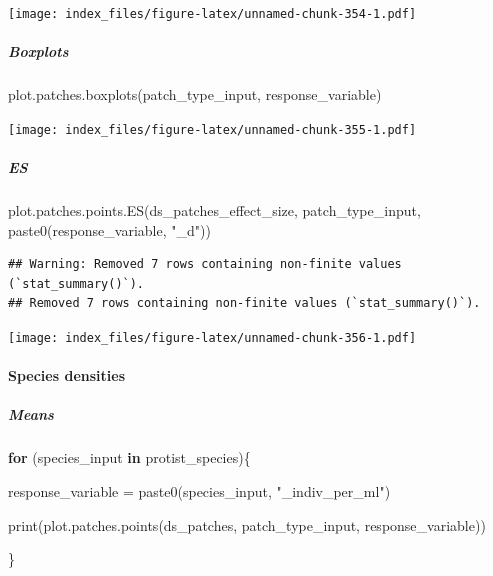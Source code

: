 \documentclass[
]{article}
\newenvironment{Shaded}{\begin{snugshade}}{\end{snugshade}}
\newcommand{\ControlFlowTok}[1]{\textcolor[rgb]{0.13,0.29,0.53}{\textbf{#1}}}
\newcommand{\FunctionTok}[1]{\textcolor[rgb]{0.00,0.00,0.00}{#1}}
\newcommand{\NormalTok}[1]{#1}
\newcommand{\OtherTok}[1]{\textcolor[rgb]{0.56,0.35,0.01}{#1}}
\newcommand{\StringTok}[1]{\textcolor[rgb]{0.31,0.60,0.02}{#1}}
\begin{document}
\texttt{[image: index\_files/figure-latex/unnamed-chunk-354-1.pdf]}

\hypertarget{boxplots-28}{%
\subparagraph{Boxplots}\label{boxplots-28}}

\begin{Shaded}
\begin{Highlighting}[]
\FunctionTok{plot.patches.boxplots}\NormalTok{(patch\_type\_input,}
\NormalTok{                       response\_variable)}
\end{Highlighting}
\end{Shaded}

\texttt{[image: index\_files/figure-latex/unnamed-chunk-355-1.pdf]}

\hypertarget{es-12}{%
\subparagraph{ES}\label{es-12}}

\begin{Shaded}
\begin{Highlighting}[]
\FunctionTok{plot.patches.points.ES}\NormalTok{(ds\_patches\_effect\_size, patch\_type\_input,}
                       \FunctionTok{paste0}\NormalTok{(response\_variable, }\StringTok{"\_d"}\NormalTok{))}
\end{Highlighting}
\end{Shaded}

\begin{verbatim}
## Warning: Removed 7 rows containing non-finite values (`stat_summary()`).
## Removed 7 rows containing non-finite values (`stat_summary()`).
\end{verbatim}

\texttt{[image: index\_files/figure-latex/unnamed-chunk-356-1.pdf]}

\hypertarget{species-densities-2}{%
\paragraph{Species densities}\label{species-densities-2}}

\hypertarget{means-31}{%
\subparagraph{Means}\label{means-31}}

\begin{Shaded}
\begin{Highlighting}[]
\ControlFlowTok{for}\NormalTok{ (species\_input }\ControlFlowTok{in}\NormalTok{ protist\_species)\{}
  
\NormalTok{  response\_variable }\OtherTok{=} \FunctionTok{paste0}\NormalTok{(species\_input, }\StringTok{"\_indiv\_per\_ml"}\NormalTok{)}
  
  \FunctionTok{print}\NormalTok{(}\FunctionTok{plot.patches.points}\NormalTok{(ds\_patches, patch\_type\_input,}
\NormalTok{                              response\_variable))}
  
\NormalTok{\}}
\end{Highlighting}
\end{Shaded}
\end{document}
